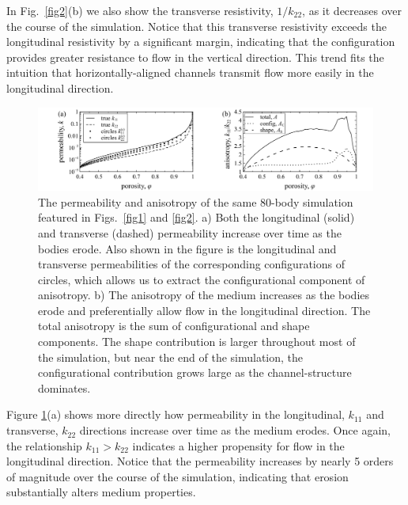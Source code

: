 \documentclass[3p]{elsarticle}
\begin{document}
In Fig.~\ref{fig2}(b) we also show the transverse resistivity, $1/k_{22}$, as it decreases over the course of the simulation. Notice that this transverse resistivity exceeds the longitudinal resistivity by a significant margin, indicating that the configuration provides greater resistance to flow in the vertical direction. This trend fits the intuition that horizontally-aligned channels transmit flow more easily in the longitudinal direction.

\begin{figure}%
\centering
\includegraphics[width = 0.99 \textwidth]{./figs/fig3.pdf}
\caption{
The permeability and anisotropy of the same 80-body simulation featured in Figs.~\ref{fig1} and \ref{fig2}. a) Both the longitudinal (solid) and transverse (dashed) permeability increase over time as the bodies erode. Also shown in the figure is the longitudinal and transverse permeabilities of the corresponding configurations of circles, which allows us to extract the configurational component of anisotropy. b) The anisotropy of the medium increases as the bodies erode and preferentially allow flow in the longitudinal direction. The total anisotropy is the sum of configurational and shape components. The shape contribution is larger throughout most of the simulation, but near the end of the simulation, the configurational contribution grows large as the channel-structure dominates.
\label{fig3}
}
\end{figure}

Figure \ref{fig3}(a) shows more directly how permeability in the longitudinal, $k_{11}$ and transverse, $k_{22}$ directions increase over time as the medium erodes. Once again, the relationship $k_{11} > k_{22}$ indicates a higher propensity for flow in the longitudinal direction. Notice that the permeability increases by nearly 5 orders of magnitude over the course of the simulation, indicating that erosion substantially alters medium properties.
\end{document}
